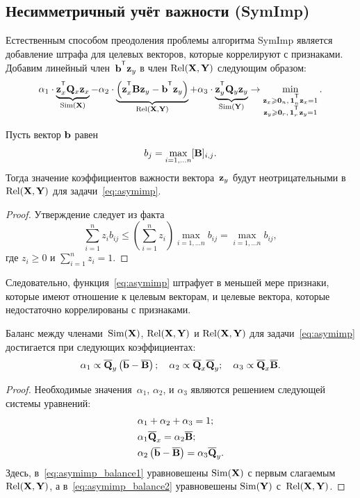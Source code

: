 \subsection{Несимметричный учёт важности (SymImp)}
Естественным способом преодоления проблемы алгоритма SymImp является добавление штрафа для целевых векторов, которые коррелируют с признаками.
Добавим линейный член~$\bb^{\T} \bz_y$ в член $\text{Rel}(\mathbf{X}, \mathbf{Y})$ следующим образом:
\begin{equation}
\alpha_1 \cdot \underbrace{\bz_x^{\T} \bQ_x \bz_x}_{\text{Sim}(\bX)} - \alpha_2 \cdot  \underbrace{\left(\bz_x^{\T} \bB \bz_y - \bb^{\T} \bz_y \right) }_{\text{Rel}(\bX, \bY)} + \alpha_3 \cdot \underbrace{\bz_y^{\T} \bQ_y \bz_y}_{\text{Sim}(\bY)} \rightarrow \min_{\substack{\bz_x \geq \bZero_n, \, \bOne_n^{\T}\bz_x=1 \\ \bz_y \geq \bZero_r, \, \bOne_r^{\T}\bz_y=1}}.
\label{eq:asymimp}
\end{equation}
\begin{statement}
	Пусть вектор $\mathbf{b}$ равен
	\begin{equation*}
	b_j = \max_{i=1, \dots n} [\mathbf{B}]_{i, j}.
	\end{equation*}
	Тогда значение коэффициентов важности вектора~$\mathbf{z}_y$ будут неотрицательными в~$\text{Rel}(\mathbf{X}, \mathbf{Y})$ для задачи~\eqref{eq:asymimp}.
\end{statement}
\begin{proof}
	Утверждение следует из факта
	\[
	\sum_{i=1}^n  z_i b_{ij} \leq \left(\sum_{i=1}^n z_i \right)\max_{i=1, \dots n} b_{ij} = \max_{i=1, \dots n} b_{ij},
	\]
	где $z_i \geq 0$ и $\sum_{i=1}^n z_i = 1$.
\end{proof}
Следовательно, функция~\eqref{eq:asymimp} штрафует в меньшей мере признаки, которые имеют отношение к целевым векторам, и целевые вектора, которые недостаточно коррелированы с признаками.
\begin{statement}
	Баланс между членами~$\text{Sim}(\mathbf{X})$, $\text{Rel}(\mathbf{X}, \mathbf{Y})$ и $\text{Rel}(\mathbf{X}, \mathbf{Y})$ для задачи~\eqref{eq:asymimp} достигается при следующих коэффициентах:
	\begin{equation*}
	\alpha_1 \propto \overline{\mathbf{Q}}_y \left( \overline{\mathbf{b}} - \overline{\mathbf{B}}\right); \quad
	\alpha_2 \propto \overline{\mathbf{Q}}_x \overline{\mathbf{Q}}_y; \quad
	\alpha_3  \propto \overline{\mathbf{Q}}_x \overline{\mathbf{B}}.
	\end{equation*}
\end{statement}
\begin{proof}
	Необходимые значения~$\alpha_1$, $\alpha_2$, и $\alpha_3$ являются решением следующей системы уравнений:
	\begin{align}
	&\alpha_1 + \alpha_2 + \alpha_3 = 1; \\
	&\alpha_1 \overline{\mathbf{Q}}_x = \alpha_2 \overline{\mathbf{B}}; \label{eq:asymimp_balance1}\\
	&\alpha_2 \left(\overline{\mathbf{b}} - \overline{\mathbf{B}} \right) = \alpha_3 \overline{\mathbf{Q}}_y.
	\label{eq:asymimp_balance2}
	\end{align}
	Здесь, в~\eqref{eq:asymimp_balance1} уравновешены $\text{Sim}(\mathbf{X})$ с первым слагаемым~$\text{Rel}(\mathbf{X}, \mathbf{Y})$, а в~\eqref{eq:asymimp_balance2} уравновешены $\text{Sim}(\mathbf{Y})$  с~$\text{Rel}(\mathbf{X}, \mathbf{Y})$.
\end{proof}
